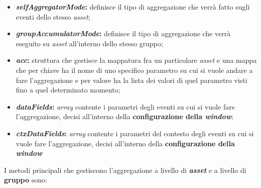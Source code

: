 \begin{itemize}
	\item{\textbf{\textit{selfAggregatorMode}:} definisce il tipo di aggregazione che verrà fatto sugli eventi dello stesso \textit{asset};}
	\item{\textbf{\textit{groupAccumulatorMode}:} definisce il tipo di aggregazione che verrà eseguito su \textit{asset} all'interno dello stesso gruppo;}
	\item{\textbf{\textit{acc}:} struttura che gestisce la mappatura fra un particolare \textit{asset} e una mappa che per chiave ha il nome di uno specifico parametro su cui si vuole andare a fare l'aggregazione e per valore ha la lista dei valori di quel parametro visti fino a quel determinato momento;}
	\item{\textbf{\textit{dataFields}:} \textit{array} contente i parametri degli eventi su cui si vuole fare l'aggregazione, decisi all'interno della \textbf{configurazione della \textit{window}};}
	\item{\textbf{\textit{ctxDataFields}:} \textit{array} contente i parametri del contesto degli eventi su cui si vuole fare l'aggregazione, decisi all'interno della \textbf{configurazione della \textit{window}}}
\end{itemize}

I metodi principali che gestiscono l'aggregazione a livello di \textbf{\textit{asset}} e a livello di \textbf{gruppo} sono:


